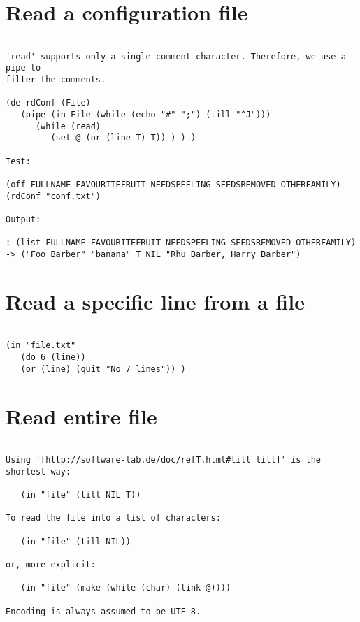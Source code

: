 \section*{Read a configuration file}

\begin{verbatim}

'read' supports only a single comment character. Therefore, we use a pipe to
filter the comments.

(de rdConf (File)
   (pipe (in File (while (echo "#" ";") (till "^J")))
      (while (read)
         (set @ (or (line T) T)) ) ) )

Test:

(off FULLNAME FAVOURITEFRUIT NEEDSPEELING SEEDSREMOVED OTHERFAMILY)
(rdConf "conf.txt")

Output:

: (list FULLNAME FAVOURITEFRUIT NEEDSPEELING SEEDSREMOVED OTHERFAMILY)
-> ("Foo Barber" "banana" T NIL "Rhu Barber, Harry Barber")

\end{verbatim}

\section*{Read a specific line from a file}

\begin{verbatim}

(in "file.txt"
   (do 6 (line))
   (or (line) (quit "No 7 lines")) )

\end{verbatim}

\section*{Read entire file}

\begin{verbatim}

Using '[http://software-lab.de/doc/refT.html#till till]' is the shortest way:

   (in "file" (till NIL T))

To read the file into a list of characters:

   (in "file" (till NIL))

or, more explicit:

   (in "file" (make (while (char) (link @))))

Encoding is always assumed to be UTF-8.

\end{verbatim}

